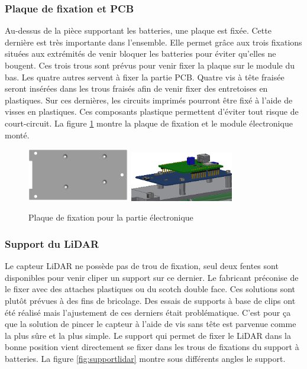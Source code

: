 \subsubsection{Plaque de fixation et PCB}

Au-dessus de la pièce supportant les batteries, une plaque est fixée. Cette dernière est très importante 
dans l’ensemble. Elle permet grâce aux trois fixations situées aux extrémités de venir bloquer les batteries 
pour éviter qu'elles ne bougent. Ces trois trous sont prévus pour venir fixer la plaque 
sur le module du bas. Les quatre autres servent à fixer la partie PCB. Quatre vis à tête fraisée seront 
insérées dans les trous fraisés afin de venir fixer des entretoises en plastiques. Sur ces dernières, 
les circuits imprimés pourront être fixé à l’aide de visses en plastiques. Ces composants 
plastique permettent d’éviter tout risque de court-circuit. La figure \ref{fig:fixelectronique} montre la plaque
de fixation et le module électronique monté.

\begin{figure}[H]
    \centering
    \includegraphics[width=0.4\textwidth]{Images/photos_PGA/plaquesmodule.PNG}
    \includegraphics[width=0.4\textwidth]{Images/photos_PGA/PCB.PNG}
    \caption{Plaque de fixation pour la partie électronique}
    \label{fig:fixelectronique}
\end{figure}

\subsubsection{Support du LiDAR}

Le capteur LiDAR ne possède pas de trou de fixation, seul deux fentes sont disponibles pour venir 
cliper un support sur ce dernier. Le fabricant préconise de le fixer avec des attaches plastiques ou du scotch 
double face. Ces solutions sont plutôt prévues à des fins de bricolage. Des essais de supports à base 
de clips ont été réalisé mais l’ajustement de ces derniers était problématique. C’est pour ça que la 
solution de pincer le capteur à l’aide de vis sans tête est parvenue comme la plus sûre et la plus simple. 
Le support qui permet de fixer le LiDAR dans la bonne position vient directement se fixer dans les 
trous de fixations du support à batteries. La figure \ref{fig:supportlidar} montre sous différents angles 
le support.

